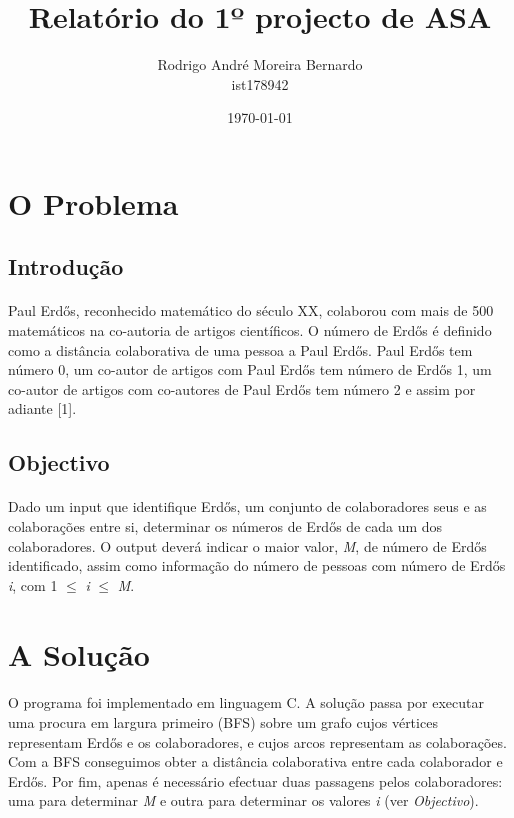 \documentclass[12pt, a4paper]{article}
\title{\textbf{Relatório do 1º projecto de ASA}}
\author{Rodrigo André Moreira Bernardo \\ ist178942}
\affil{Instituto Superior Técnico}
\date{\today}
\begin{document}
\maketitle

\section{O Problema}

\subsection{Introdução}
\paragraph{}
Paul Erdős, reconhecido matemático do século XX, colaborou com mais de 500
matemáticos na co-autoria de artigos científicos.
O número de Erdős é definido como a distância colaborativa de uma pessoa a Paul
Erdős. Paul Erdős tem número 0, um co-autor de artigos com Paul Erdős tem número
de Erdős 1, um co-autor de artigos com co-autores de Paul Erdős tem número 2 e
assim por adiante [1].

\subsection{Objectivo}
\paragraph{}
Dado um input que identifique Erdős, um conjunto de colaboradores seus e as
colaborações entre si, determinar os números de Erdős de cada um dos
colaboradores. O output deverá indicar o maior valor, \textit{M}, de número de Erdős
identificado, assim como informação do número de pessoas com número de
Erdős \textit{i}, com 1 $\leq$ \textit{i} $\leq$ \textit{M}.

\section{A Solução}
\paragraph{}
O programa foi implementado em linguagem C.
A solução passa por executar uma procura em largura primeiro (BFS) sobre um
grafo cujos vértices representam Erdős e os colaboradores, e cujos arcos
representam as colaborações. Com a BFS conseguimos obter a distância
colaborativa entre cada colaborador e Erdős. Por fim, apenas é necessário
efectuar duas passagens pelos colaboradores: uma para determinar \textit{M} e
outra para determinar os valores \textit{i} (ver \textit{Objectivo}).
\end{document}
